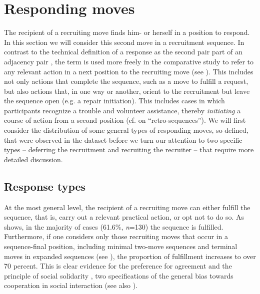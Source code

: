\documentclass[output=paper,nonflat,modfont,draft]{langsci/langscibook}
\begin{document}
\section{Responding moves}
\label{sec:kendrick:5}
The recipient of a recruiting move finds him- or herself in a position to respond. In this section we will consider this second move in a recruitment sequence. In contrast to the technical definition of a response as the second pair part of an adjacency pair \citep{SchegloffSacks1973, Schegloff2007sequence}, the term is used more freely in the comparative study to refer to any relevant action in a next position to the recruiting move (see ). This includes not only actions that complete the sequence, such as a move to fulfill a request, but also actions that, in one way or another, orient to the recruitment but leave the sequence open (e.g. a repair initiation). This includes cases in which participants recognize a trouble and volunteer assistance, thereby \textit{initiating} a course of action from a second position (cf. \citealt{Schegloff2007sequence} on “retro-sequences”). We will first consider the distribution of some general types of responding moves, so defined, that were observed in the dataset before we turn our attention to two specific types -- deferring the recruitment and recruiting the recruiter -- that require more detailed discussion.

\subsection{Response types}
At the most general level, the recipient of a recruiting move can either fulfill the sequence, that is, carry out a relevant practical action, or opt not to do so. As  shows, in the majority of cases (61.6\%, \textit{n}=130) the sequence is fulfilled. Furthermore, if one considers only those recruiting moves that occur in a sequence-final position, including minimal two-move sequences and terminal moves in expanded sequences (see ), the proportion of fulfillment increases to over 70 percent. This is clear evidence for the preference for agreement \citep{Sacks1987} and the principle of social solidarity \citep{heritage1984garfinkel}, two specifications of the general bias towards cooperation in social interaction (see also \citealt{FloydEtAl2018}).
\end{document}

